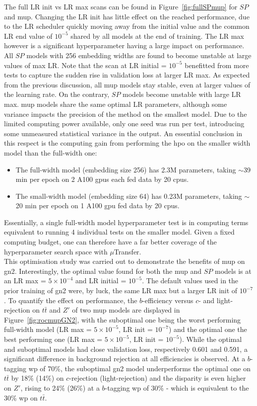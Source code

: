 The full LR init vs LR max scans can be found in Figure~\ref{fig:fullSPmup} for $SP$ and \gls{mup}. Changing the LR init has little effect on the reached performance, due to the LR scheduler quickly moving away from the initial value and the common LR end value of $10^{-5}$ shared by all models at the end of training. The LR max however is a significant hyperparameter having a large impact on performance. All $SP$ models with 256 embedding widths are found to become unstable at large values of max LR. Note that the scan at LR initial = $10^{-5}$ benefitted from more tests to capture the sudden rise in validation loss at larger LR max. As expected from the previous discussion, all \gls{mup} models stay stable, even at larger values of the learning rate. On the contrary, $SP$ models become unstable with large LR max. \gls{mup} models share the same optimal LR parameters, although some variance impacts the precision of the method on the smallest model. Due to the limited computing power available, only one seed was run per test, introducing some unmeasured statistical variance in the output. An essential conclusion in this respect is the computing gain from performing the \gls{hpo} on the smaller width model than the full-width one:
\begin{itemize}
  \item The full-width model (embedding size 256) has 2.3M parameters, taking $\sim$39 min per epoch on 2 A100 \glspl{gpu} each fed data by 20 \glspl{cpu}.
  \item The small-width model (embedding size 64) has 0.23M parameters, taking $\sim$20 min per epoch on 1 A100 \gls{gpu} fed data by 20 \glspl{cpu}.
\end{itemize}
Essentially, a single full-width model hyperparameter test is in computing terms equivalent to running 4 individual tests on the smaller model. Given a fixed computing budget, one can therefore have a far better coverage of the hyperparameter search space with $\mu$Transfer.\\

This optimisation study was carried out to demonstrate the benefits of \gls{mup} on \gls{gn2}. Interestingly, the optimal value found for both the \gls{mup} and $SP$ models is at an LR max = $5 \times 10^{-4}$ and LR initial = $10^{-5}$. The default values used in the prior training of \gls{gn2} were, by luck, the same LR max but a larger LR init of $10^{-7}$. To quantify the effect on performance, the $b$-efficiency versus $c$- and light-rejection on $t\bar{t}$ and $Z'$ of two \gls{mup} models are displayed in Figure~\ref{fig:rocmupGN2}, with the suboptimal one being the worst performing full-width model (LR max = $5 \times 10^{-5}$, LR init = $10^{-7}$) and the optimal one the best performing one (LR max = $5\times 10^{-5}$, LR init = $10^{-5}$). While the optimal and suboptimal models had close validation loss, respectively 0.601 and 0.591, a significant difference in background rejection at all efficiencies is observed. At a $b$-tagging \gls{wp} of 70\%, the suboptimal \gls{gn2} model underperforms the optimal one on $t\bar{t}$ by 18\% (14\%) on $c$-rejection (light-rejection) and the disparity is even higher on $Z'$, rising to 24\% (26\%) at a $b$-tagging \gls{wp} of 30\% - which is equivalent to the 30\% \gls{wp} on $t\bar{t}$.

